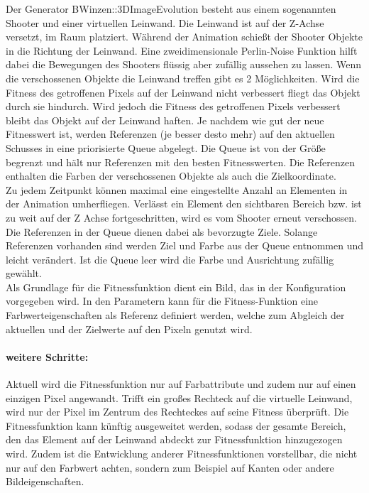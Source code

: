 \documentclass[../mciAusarbeitung.tex]{subfiles}
\begin{document}
		Der Generator BWinzen::3DImageEvolution besteht aus einem sogenannten Shooter und einer virtuellen Leinwand. Die Leinwand ist auf der Z-Achse versetzt, im Raum platziert. Während der Animation schießt der Shooter Objekte in die Richtung der Leinwand. Eine zweidimensionale Perlin-Noise Funktion hilft dabei die Bewegungen des Shooters flüssig aber zufällig aussehen zu lassen. 
		Wenn die verschossenen Objekte die Leinwand treffen gibt es 2 Möglichkeiten. Wird die Fitness des getroffenen Pixels auf der Leinwand nicht verbessert fliegt das Objekt durch sie hindurch. Wird jedoch die Fitness des getroffenen Pixels verbessert bleibt das Objekt auf der Leinwand haften. Je nachdem wie gut der neue Fitnesswert ist, werden Referenzen (je besser desto mehr) auf den aktuellen Schusses in eine priorisierte Queue abgelegt. Die Queue ist von der Größe begrenzt und hält nur Referenzen mit den besten Fitnesswerten. Die Referenzen enthalten die Farben der verschossenen Objekte als auch die Zielkoordinate.\\
		Zu jedem Zeitpunkt können maximal eine eingestellte Anzahl an Elementen in der Animation umherfliegen. Verlässt ein Element den sichtbaren Bereich bzw. ist zu weit auf der Z Achse fortgeschritten, wird es vom Shooter erneut verschossen.	Die Referenzen in der Queue dienen dabei als bevorzugte Ziele. Solange Referenzen vorhanden sind werden Ziel und Farbe aus der Queue entnommen und leicht verändert. Ist die Queue leer wird die Farbe und Ausrichtung zufällig gewählt.\\
		Als Grundlage für die Fitnessfunktion dient ein Bild, das in der Konfiguration vorgegeben wird. In den Parametern kann für die Fitness-Funktion eine Farbwerteigenschaften als Referenz definiert werden, welche zum Abgleich der aktuellen und der Zielwerte auf den Pixeln genutzt wird.
		
	\paragraph{weitere Schritte:}
		 Aktuell wird die Fitnessfunktion nur auf Farbattribute und zudem nur auf einen einzigen Pixel angewandt. Trifft ein großes Rechteck auf die virtuelle Leinwand, wird nur der Pixel im Zentrum des Rechteckes auf seine Fitness überprüft. Die Fitnessfunktion kann künftig ausgeweitet werden, sodass der gesamte Bereich, den das Element auf der Leinwand abdeckt zur Fitnessfunktion hinzugezogen wird. Zudem ist die Entwicklung anderer Fitnessfunktionen vorstellbar, die nicht nur auf den Farbwert achten, sondern zum Beispiel auf Kanten oder andere Bildeigenschaften.
		 
\end{document}
